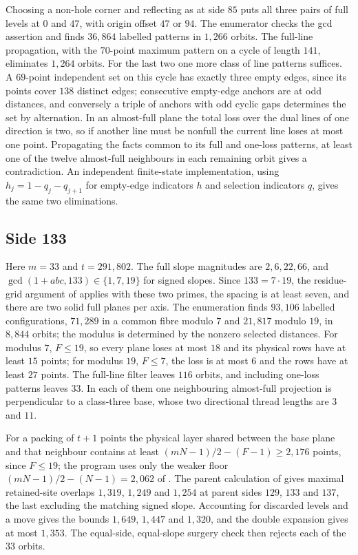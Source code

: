 \documentclass[11pt,colorlinks]{charlie}
\begin{document}
Choosing a non-hole corner and reflecting as at side $85$ puts all three pairs of full levels at $0$ and $47$, with origin offset $47$ or $94$. The enumerator checks the gcd assertion and finds $36{,}864$ labelled patterns in $1{,}266$ orbits. The full-line propagation, with the $70$-point maximum pattern on a cycle of length $141$, eliminates $1{,}264$ orbits. For the last two one more class of line patterns suffices. A $69$-point independent set on this cycle has exactly three empty edges, since its points cover $138$ distinct edges; consecutive empty-edge anchors are at odd distances, and conversely a triple of anchors with odd cyclic gaps determines the set by alternation. In an almost-full plane the total loss over the dual lines of one direction is two, so if another line must be nonfull the current line loses at most one point. Propagating the facts common to its full and one-loss patterns, at least one of the twelve almost-full neighbours in each remaining orbit gives a contradiction. An independent finite-state implementation, using $h_j=1-q_j-q_{j+1}$ for empty-edge indicators $h$ and selection indicators $q$, gives the same two eliminations.

\subsection{Side 133}
Here $m=33$ and $t=291{,}802$. The full slope magnitudes are $2,6,22,66$, and $\gcd(1+abc,133)\in\{1,7,19\}$ for signed slopes. Since $133=7\cdot19$, the residue-grid argument of  applies with these two primes, the spacing is at least seven, and there are two solid full planes per axis. The enumeration finds $93{,}106$ labelled configurations, $71{,}289$ in a common fibre modulo $7$ and $21{,}817$ modulo $19$, in $8{,}844$ orbits; the modulus is determined by the nonzero selected distances. For modulus $7$, $F\le19$, so every plane loses at most $18$ and its physical rows have at least $15$ points; for modulus $19$, $F\le7$, the loss is at most $6$ and the rows have at least $27$ points. The full-line filter leaves $116$ orbits, and including one-loss patterns leaves $33$. In each of them one neighbouring almost-full projection is perpendicular to a class-three base, whose two directional thread lengths are $3$ and $11$.

For a packing of $t+1$ points the physical layer shared between the base plane and that neighbour contains at least $(mN-1)/2-(F-1)\ge2{,}176$ points, since $F\le19$; the program uses only the weaker floor $(mN-1)/2-(N-1)=2{,}062$ of . The parent calculation of  gives maximal retained-site overlaps $1{,}319$, $1{,}249$ and $1{,}254$ at parent sides $129$, $133$ and $137$, the last excluding the matching signed slope. Accounting for discarded levels and a move gives the bounds $1{,}649$, $1{,}447$ and $1{,}320$, and the double expansion gives at most $1{,}353$. The equal-side, equal-slope surgery check then rejects each of the $33$ orbits.
\end{document}
